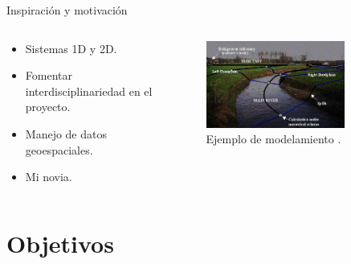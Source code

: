 \documentclass[17pt, t, lualatex]{beamer}
\begin{document}
\begin{frame}{Inspiración y motivación}

  \begin{columns}
    \begin{column}{.5\textwidth}
      \begin{itemize}
        \item Sistemas 1D y 2D.
        \item Fomentar interdisciplinariedad en el proyecto.
        \item Manejo de datos geoespaciales.
        \item Mi novia.
      \end{itemize}

      
    \end{column}

    \begin{column}{.5\textwidth}
      \begin{figure}[ht]
        \centering
        \includegraphics[width=0.8\textwidth]{img/2.png}
        \caption{\label{fig:2} Ejemplo de modelamiento \parencite{kuleuven_river_image}.}
      \end{figure}

    \end{column}
  \end{columns}

\end{frame}


\section{Objetivos}

\insertsectionpage
\end{document}
